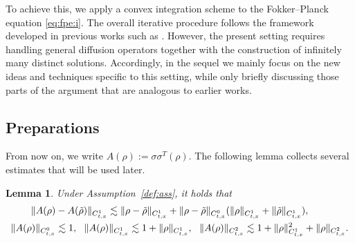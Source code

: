 \documentclass[UTF-8,reqno]{amsart}
\numberwithin{equation}{section}
\newtheorem{lemma}[theorem]{Lemma}
\theoremstyle{definition}
\begin{document}
To achieve this, we apply a convex integration scheme to the Fokker--Planck equation \eqref{eq:fpe:i}. 
The overall iterative procedure follows the framework developed in previous works such as \cite{LRZ25,LR25}. 
However, the present setting requires handling general diffusion operators together with the construction of infinitely many distinct solutions. 
Accordingly, in the sequel we mainly focus on the new ideas and techniques specific to this setting, while only briefly discussing those parts of the argument that are analogous to earlier works.  

\subsection{Preparations} 
From now on, we write
$
A(\rho):=\sigma\sigma^T(\rho).
$
The following lemma collects several estimates that will be used later.

\begin{lemma}\label{lem:A}
Under Assumption~\ref{def:ass}, it holds that
\begin{align}
\|A(\rho)&-A(\tilde{\rho})\|_{C_{t,x}^1}
\lesssim
   \|\rho- \tilde{\rho} \|_{C_{t,x}^1}+\|\rho- \tilde{\rho} \|_{C_{t,x}^0}(\|\rho \|_{C_{t,x}^1}+\|\tilde\rho \|_{C_{t,x}^1}),
\notag\\
\|A(\rho)\|_{C_{t,x}^0}
&\lesssim 1,
\notag\ \
\|A(\rho)\|_{C_{t,x}^1}
\lesssim 1+\|\rho\|_{C_{t,x}^1},\ \ \|A(\rho)\|_{C_{t,x}^2}
\lesssim 1+\|\rho\|_{C_{t,x}^1}^2+\|\rho\|_{C_{t,x}^2}.
\notag
\end{align}
\end{lemma}
\end{document}
